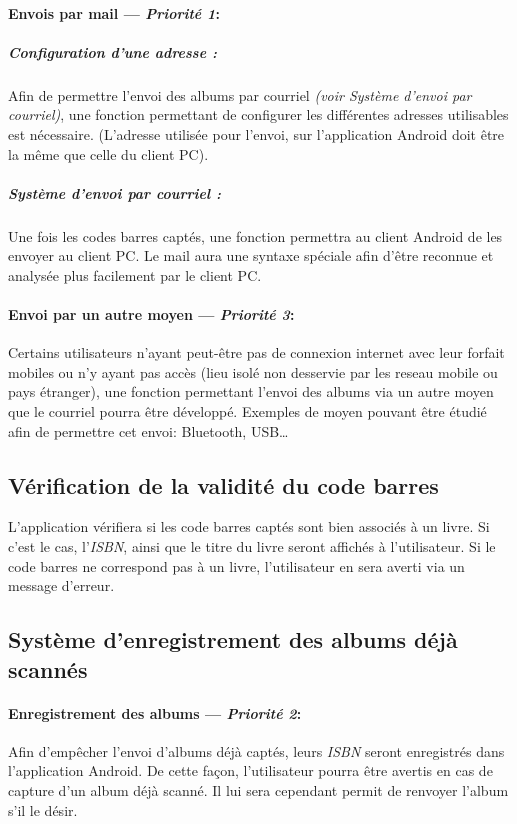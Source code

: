 \paragraph{Envois par mail ---  \textit{Priorité 1}:}
\subparagraph{Configuration d'une adresse :}
Afin de permettre l'envoi des albums par courriel \textit{(voir Système d'envoi par courriel)}, une fonction permettant de configurer les différentes adresses utilisables est nécessaire. (L'adresse utilisée pour l'envoi, sur l'application Android doit être la même que celle du client PC).

\subparagraph{Système d'envoi par courriel :} 
Une fois les codes barres captés, une fonction permettra au client Android de les envoyer au client PC. 
Le mail aura une syntaxe spéciale afin d'être reconnue et analysée plus facilement par le client PC. 

\paragraph{Envoi par un autre moyen ---  \textit{Priorité 3}:}
Certains utilisateurs n'ayant peut-être pas de connexion internet avec leur forfait mobiles ou n'y ayant pas accès (lieu isolé non desservie par les reseau mobile ou pays étranger), une fonction permettant l'envoi des albums via un autre moyen que le courriel pourra être développé.
Exemples de moyen pouvant être étudié afin de permettre cet envoi: Bluetooth, USB…

\subsection{Vérification de la validité du code barres}
L'application vérifiera si les code barres captés sont bien associés à un livre.
Si c'est le cas, l'\emph{ISBN}, ainsi que le titre du livre seront affichés à l'utilisateur.
Si le code barres ne correspond pas à un livre, l'utilisateur en sera averti via un message d'erreur.

\subsection{Système d'enregistrement des albums déjà scannés}
\paragraph{Enregistrement des albums ---  \textit{Priorité 2}:} 
Afin d'empêcher l'envoi d'albums déjà captés, leurs \emph{ISBN} seront enregistrés dans l'application Android. 
De cette façon, l'utilisateur pourra être avertis en cas de capture d'un album déjà scanné.
Il lui sera cependant permit de renvoyer l'album s'il le désir.

